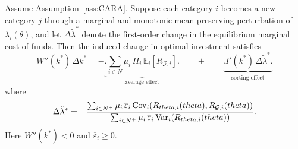 \documentclass[master.tex]{subfiles}
\begin{document}
\begin{proposition}\label{prop:investment}
Assume Assumption~\ref{ass:CARA}. Suppose each category \(i\) becomes a new category \(j\) through a marginal and monotonic mean-preserving perturbation of \(\lambda_i(\theta)\), and let \(\Delta\tilde\lambda^\ast\) denote the first-order change in the equilibrium marginal cost of funds. Then the induced change in optimal investment satisfies
\[
W''(k^\ast)\,\Delta k^\ast
=
-\underbrace{\Bigg.\sum_{i\in N}\mu_i\,\Pi_i\,\mathbb E_i[R_{\mathcal G,i}]\Bigg.}_{\text{average effect}}
\qquad +  \qquad \underbrace{ \Bigg.I'(k^\ast)\,\Delta\tilde\lambda^\ast\Bigg.}_{\text{sorting effect}}
\]
where
\[
\Delta\tilde\lambda^\ast
=
-
\frac{
\sum_{i\in N^+}\mu_i\,\overline\varepsilon_i\,
\mathrm{Cov}_i\!\left(
R_{theta,i}(theta),R_{\mathcal G,i}(theta)
\right)
}{
\sum_{i\in N^+}\mu_i\,\overline\varepsilon_i\,
\mathrm{Var}_i\!\left(
R_{theta,i}(theta)
\right)
}.
\]
Here \(W''(k^\ast)<0\) and \(\overline\varepsilon_i \geq 0\).
\end{proposition}
\end{document}
